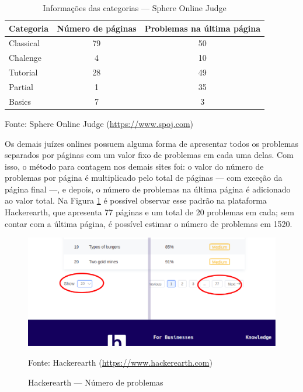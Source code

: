\begin{table}
    \caption[Caption for LOF]{Informações das categorias — Sphere Online Judge \footnotemark}
    \centering
    \label{table:spoj_categories}
    \begin{threeparttable}
        \begin{tabular}{lcc}
        \toprule
        \textbf{Categoria} & \textbf{Número de páginas} & \textbf{Problemas na última página} \\
        \midrule
        Classical & 79                & 50                         \\
        Chalenge  & 4                 & 10                         \\
        Tutorial  & 28                & 49                         \\
        Partial   & 1                 & 35                         \\
        Basics    & 7                 & 3    
         \\
        \bottomrule
        \end{tabular}
        \begin{tablenotes}
        \centering
        \item Fonte: Sphere Online Judge (\url{https://www.spoj.com})
        \end{tablenotes}
    \end{threeparttable}
\end{table}

Os demais juízes onlines possuem alguma forma de apresentar todos os problemas separados por páginas com um valor fixo de problemas em cada uma delas. Com isso, o método para contagem nos demais sites foi: o valor do número de problemas por página é multiplicado pelo total de páginas — com exceção da página final —, e depois, o número de problemas na última página é adicionado ao valor total. Na Figura \ref{fig:hackerearth_numero_problemas} é possível observar esse padrão na plataforma Hackerearth, que apresenta 77 páginas e um total de 20 problemas em cada; sem contar com a última página, é possível estimar o número de problemas em 1520.
 
\begin{figure}
    \centering
    \caption{Hackerearth — Número de problemas}
    \includegraphics[keepaspectratio=true,scale=0.45]{figuras/hackerearth_numero_problemas.eps}
    \label{fig:hackerearth_numero_problemas}
    
    \medskip
    Fonte: Hackerearth (\url{https://www.hackerearth.com})
    \medskip
\end{figure}

